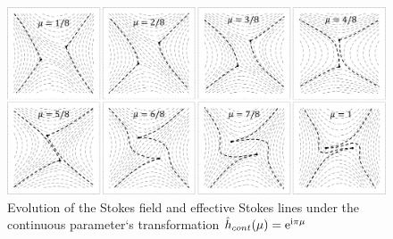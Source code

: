 \documentclass[12pt]{iopart}
\def\h{\hat{h}}
\begin{document}
\begin{figure}
\centering
\noindent
\includegraphics[width=\textwidth]{stuff/wrs.png}
\caption{Evolution of the Stokes field and effective Stokes lines 
under the continuous parameter`s transformation $\h_{cont}(\mu)=\rme^{\rmi\pi\mu}$}
\label{fig:webrs}
\end{figure} 
\end{document}
